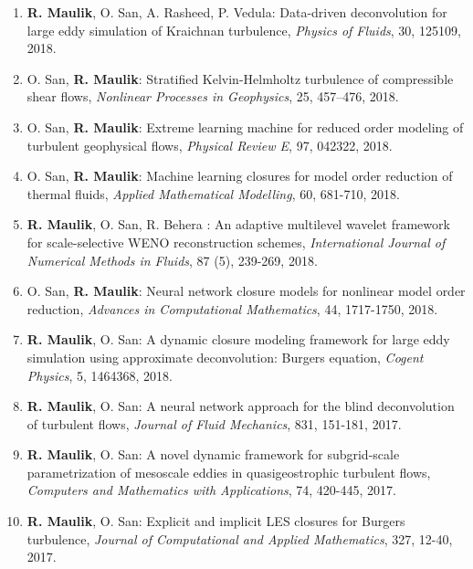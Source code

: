 \documentclass[letterpaper]{article}
\begin{document}
\begin{enumerate}
\item \textbf{R. Maulik}, O. San, A. Rasheed, P. Vedula: Data-driven deconvolution for large eddy simulation of Kraichnan turbulence, {\it Physics of Fluids}, 30, 125109, 2018. 

\item O. San, \textbf{R. Maulik}: Stratified Kelvin-Helmholtz turbulence of compressible shear flows, {\it Nonlinear Processes in Geophysics}, 25, 457--476, 2018.

\item O. San, \textbf{R. Maulik}: Extreme learning machine for reduced order modeling of turbulent geophysical flows, {\it Physical Review E}, 97, 042322, 2018. 

\item O. San, \textbf{R. Maulik}: Machine learning closures for model order reduction of thermal fluids,  {\it Applied Mathematical Modelling}, 60, 681-710, 2018. 

\item \textbf{R. Maulik}, O. San, R. Behera : An adaptive multilevel wavelet framework for scale-selective WENO reconstruction schemes, {\it International Journal of Numerical Methods in Fluids}, 87 (5), 239-269, 2018. 

\item O. San, \textbf{R. Maulik}: Neural network closure models for nonlinear model order reduction, {\it Advances in Computational Mathematics}, 44, 1717-1750, 2018. 

\item \textbf{R. Maulik}, O. San: A dynamic closure modeling framework for large eddy simulation using approximate deconvolution: Burgers equation, {\it Cogent Physics}, 5, 1464368, 2018. 

\item \textbf{R. Maulik}, O. San: A neural network approach for the blind deconvolution of turbulent flows, {\it Journal of Fluid Mechanics}, 831, 151-181, 2017. 

\item \textbf{R. Maulik}, O. San: A novel dynamic framework for subgrid-scale parametrization of mesoscale eddies in quasigeostrophic turbulent flows, {\it Computers and Mathematics with Applications}, 74, 420-445, 2017. 

\item \textbf{R. Maulik}, O. San: Explicit and implicit LES closures for Burgers turbulence, {\it Journal of Computational and Applied Mathematics}, 327, 12-40, 2017. 


\end{enumerate}
\end{document}
